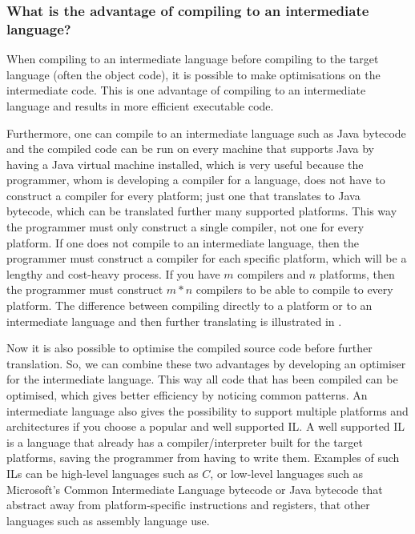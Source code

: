 \subsubsection{What is the advantage of compiling to an intermediate language?}

When compiling to an intermediate language before compiling to the target
language (often the object code), it is possible to make optimisations on the
intermediate code. This is one advantage of compiling to an intermediate
language and results in more efficient executable code.

Furthermore, one can compile to an intermediate language such as Java
bytecode and the compiled code can be run on every machine that supports
Java by having a Java virtual machine installed, which is very useful
because the programmer, whom is developing a compiler for a language,
does not have to construct a compiler for every platform; just one
that translates to Java bytecode, which can be translated further many
supported platforms. This way the programmer must only construct a
single compiler, not one for every platform. If one does not compile
to an intermediate language, then the programmer must construct a
compiler for each specific platform, which will be a lengthy and
cost-heavy process. If you have $m$ compilers and $n$ platforms, then
the programmer must construct $m*n$ compilers to be able to compile
to every platform. The difference between compiling directly to a
platform or to an intermediate language and then further translating is
illustrated in .



Now it is also possible to optimise the compiled source code before
further translation. So, we can combine these two advantages by
developing an optimiser for the intermediate language. This way all
code that has been compiled can be optimised, which gives better
efficiency by noticing common patterns. An intermediate language also
gives the possibility to support multiple platforms and architectures
if you choose a popular and well supported IL. A well supported IL is a
language that already has a compiler/interpreter built for the target
platforms, saving the programmer from having to write them. Examples
of such ILs can be high-level languages such as $C$, or low-level
languages such as Microsoft's Common Intermediate Language bytecode or
Java bytecode that abstract away from platform-specific instructions and
registers, that other languages such as assembly language use.
